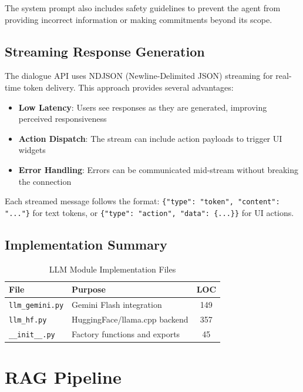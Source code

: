 The system prompt also includes safety guidelines to prevent the agent from providing incorrect information or making commitments beyond its scope.

\subsection{Streaming Response Generation}

The dialogue API uses NDJSON (Newline-Delimited JSON) streaming for real-time token delivery. This approach provides several advantages:

\begin{itemize}
    \item \textbf{Low Latency}: Users see responses as they are generated, improving perceived responsiveness
    \item \textbf{Action Dispatch}: The stream can include action payloads to trigger UI widgets
    \item \textbf{Error Handling}: Errors can be communicated mid-stream without breaking the connection
\end{itemize}

Each streamed message follows the format: \texttt{\{"type": "token", "content": "..."\}} for text tokens, or \texttt{\{"type": "action", "data": \{...\}\}} for UI actions.

\subsection{Implementation Summary}

\begin{table}[!htbp]
\centering
\caption{LLM Module Implementation Files}
\label{tab:llm-files}
\begin{tabular}{|l|l|c|}
\hline
\textbf{File} & \textbf{Purpose} & \textbf{LOC} \\ \hline
\texttt{llm\_gemini.py} & Gemini Flash integration & 149 \\ \hline
\texttt{llm\_hf.py} & HuggingFace/llama.cpp backend & 357 \\ \hline
\texttt{\_\_init\_\_.py} & Factory functions and exports & 45 \\ \hline
\end{tabular}
\end{table}

\section{RAG Pipeline}

